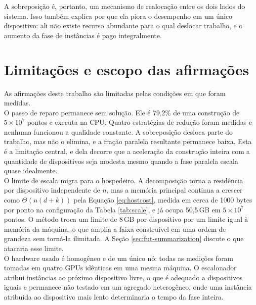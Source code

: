 A sobreposição é, portanto, um mecanismo de realocação entre os dois lados do sistema. Isso também explica por que ela piora o desempenho em um único dispositivo: ali não existe recurso abundante para o qual deslocar trabalho, e o aumento da fase de instâncias é pago integralmente.\\

\section{Limitações e escopo das afirmações\label{sec:disc-limits}}

As afirmações deste trabalho são limitadas pelas condições em que foram medidas.\\

O passo de reparo permanece sem solução. Ele é 79,2\% de uma construção de $5 \times 10^7$ pontos e executa na \ac{CPU}. Quatro estratégias de redução foram medidas e nenhuma funcionou a qualidade constante. A sobreposição desloca parte do trabalho, mas não o elimina, e a fração paralela resultante permanece baixa. Esta é a limitação central, e dela decorre que a aceleração da construção inteira com a quantidade de dispositivos seja modesta mesmo quando a fase paralela escala quase idealmente.\\

O limite de escala migra para o hospedeiro. A decomposição torna a residência por dispositivo independente de $n$, mas a memória principal continua a crescer como $\Theta(n(d+k))$ pela Equação \eqref{eq:hostcost}, medida em cerca de 1000 bytes por ponto na configuração da Tabela \ref{tab:scale}, e já ocupa 50,5\,GB em $5 \times 10^7$ pontos. O método troca um limite de 8\,GB por dispositivo por um limite igual à memória da máquina, o que amplia a faixa construível em uma ordem de grandeza sem torná-la ilimitada. A Seção \ref{sec:fut-summarization} discute o que atacaria esse limite.\\

O hardware usado é homogêneo e de um único nó: todas as medições foram tomadas em quatro \ac{GPU}s idênticas em uma mesma máquina. O escalonador atribui instâncias ao próximo dispositivo livre, o que é adequado a dispositivos iguais e permanece não testado em um agregado heterogêneo, onde uma instância atribuída ao dispositivo mais lento determinaria o tempo da fase inteira.\\

